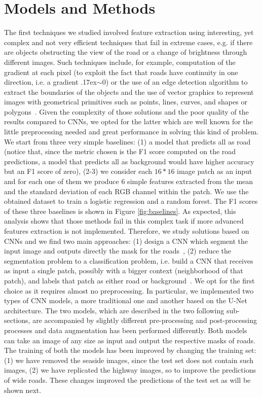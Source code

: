\documentclass[10pt,conference,compsocconf]{IEEEtran}
\begin{document}
\section{Models and Methods}
\label{sec:models-methods}
The first techniques we studied involved feature extraction using interesting, yet complex and not very efficient techniques that fail in extreme cases, e.g. if there are objects obstructing the view of the road or a change of brightness through different images. Such techniques include, for example, computation of the gradient at each pixel (to exploit the fact that roads have continuity in one direction, i.e. a gradient {\raise.17ex\hbox{$\scriptstyle\sim$}}0) or the use of an edge detection algorithm to extract the boundaries of the objects and the use of vector graphics to represent images with geometrical primitives such as points, lines, curves, and shapes or polygons~\cite{HORMESE20161460}. Given the complexity of those solutions and the poor quality of the results compared to CNNs, we opted for the latter which are well known for the little preprocessing needed and great performance in solving this kind of problem.
We start from three very simple baselines: (1) a model that predicts all as road (notice that, since the metric chosen is the F1 score computed on the road predictions, a model that predicts all as background would have higher accuracy but an F1 score of zero), (2-3) we consider each $16*16$ image patch as an input and for each one of them we produce 6 simple features extracted from the mean and the standard deviation of each RGB channel within the patch. We use the obtained dataset to train a logistic regression and a random forest. The F1 scores of these three baselines is shown in Figure \ref{fig:baselines}. As expected, this analysis shows that those methods fail in this complex task if more advanced features extraction is not implemented.
Therefore, we study solutions based on CNNs and we find two main approaches: (1) design a CNN which segment the input image and outputs directly the mask for the roads~\cite{lis2016}, (2) reduce the segmentation problem to a classification problem, i.e. build a CNN that receives as input a single patch, possibly with a bigger context (neighborhood of that patch), and labels that patch as either road or background~\cite{dario2016}. We opt for the first choice as it requires almost no preprocessing. In particular, we implemented two types of CNN models, a more traditional one and another based on the U-Net architecture. The two models, which are described in the two following sub-sections, are accompanied by slightly different pre-processing and post-processing processes and data augmentation has been performed differently. Both models can take an image of any size as input and output the respective masks of roads. The training of both the models has been improved by changing the training set: (1) we have removed the seaside images, since the test set does not contain such images, (2) we have replicated the highway images, so to improve the predictions of wide roads. These changes improved the predictions of the test set as will be shown next.
\end{document}
